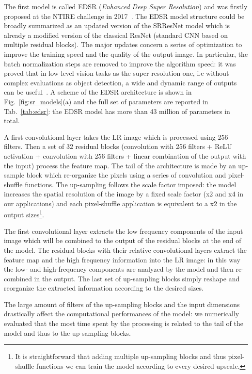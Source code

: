 \documentclass{standalone}
\begin{document}
The first model is called EDSR (\emph{Enhanced Deep Super Resolution}) and was firstly proposed at the NTIRE challenge in 2017~\cite{Agustsson_2017_CVPR_Workshops}.
The EDSR model structure could be broadly summarized as an updated version of the SRResNet model which is already a modified version of the classical ResNet (standard CNN based on multiple residual blocks).
The major updates concern a series of optimization to improve the training speed and the quality of the output image.
In particular, the batch normalization steps are removed to improve the algorithm speed: it was proved that in low-level vision tasks as the super resolution one, i.e without complex evaluations as object detection, a wide and dynamic range of outputs can be useful~\cite{edsr}.
A scheme of the EDSR architecture is shown in Fig.~\ref{fig:sr_models}(a) and the full set of parameters are reported in Tab.~\ref{tab:edsr}: the EDSR model has more than 43 million of parameters in total.

A first convolutional layer takes the LR image which is processed using 256 filters.
Then a set of 32 residual blocks (convolution with 256 filters + ReLU activation + convolution with 256 filters + linear combination of the output with the input) process the feature map.
The tail of the architecture is made by an up-sample block which re-organize the pixels using a series of convolution and pixel-shuffle functions.
The up-sampling follows the scale factor imposed: the model increases the spatial resolution of the image by a fixed scale factor (x2 and x4 in our applications) and each pixel-shuffle application is equivalent to a x2 in the output sizes\footnote{
  It is straightforward that adding multiple up-sampling blocks and thus pixel-shuffle functions we can train the model according to every desired upscale.
}.

The first convolutional layer extracts the low frequency components of the input image which will be combined to the output of the residual blocks at the end of the model.
The residual blocks with their relative convolutional layers extract the feature map and the high frequency information into the LR image: in this way the low- and high-frequency components are  analyzed by the model and then re-combined in the output.
The last set of up-sampling blocks simply reshape and reorganize the extracted information according to the desired sizes.

The large amount of filters of the up-sampling blocks and the input dimensions drastically affect the computational performances of the model: we numerically evaluated that the most time spent by the processing is related to the tail of the model and thus to the up-sampling blocks.
\end{document}
